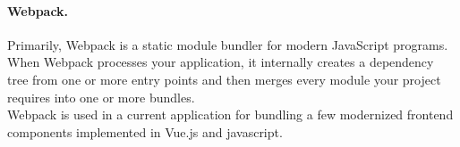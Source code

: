 \paragraph*{Webpack.} Primarily, Webpack is a static module bundler for modern JavaScript programs. When Webpack processes your application, it internally creates a dependency tree from one or more entry points and then merges every module your project requires into one or more bundles.\cite{webpack-doc}\\
Webpack is used in a current application for bundling a few modernized frontend components implemented in Vue.js and javascript.

